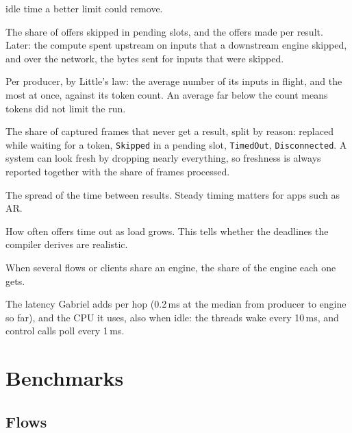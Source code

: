 \documentclass[11pt]{article}
\newcommand{\code}[1]{\texttt{#1}}
\begin{document}
\begin{description}[style=nextline, leftmargin=1.5em]
        idle time a better limit could remove.
  \item[Waste (partly done)] The share of offers skipped in pending slots,
        and the offers made per result. Later: the compute spent upstream on
        inputs that a downstream engine skipped, and over the network, the
        bytes sent for inputs that were skipped.
  \item[Tokens in use (done)] Per producer, by Little's law: the average
        number of its inputs in flight, and the most at once, against its
        token count. An average far below the count means tokens did not
        limit the run.
  \item[Drops and why] The share of captured frames that never get a result,
        split by reason: replaced while waiting for a token, \code{Skipped}
        in a pending slot, \code{TimedOut}, \code{Disconnected}. A system can
        look fresh by dropping nearly everything, so freshness is always
        reported together with the share of frames processed.
  \item[Jitter] The spread of the time between results. Steady timing
        matters for apps such as AR.
  \item[Timeouts] How often offers time out as load grows. This tells
        whether the deadlines the compiler derives are realistic.
  \item[Fairness] When several flows or clients share an engine, the share
        of the engine each one gets.
  \item[Overhead] The latency Gabriel adds per hop (0.2\,ms at the median from
        producer to engine so far), and the CPU it uses, also when idle: the
        threads wake every 10\,ms, and control calls poll every 1\,ms.
\end{description}

\section{Benchmarks}

\subsection{Flows}
\end{document}
